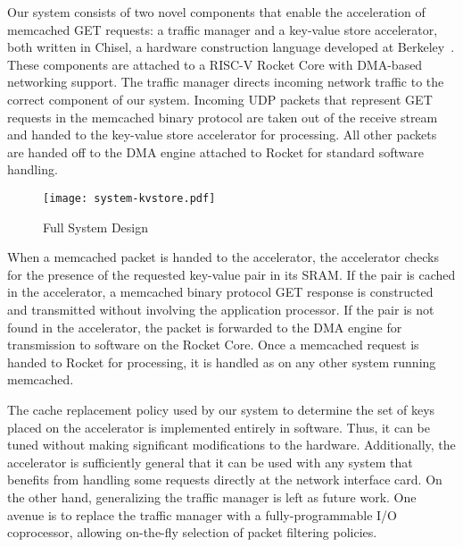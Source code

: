 Our system consists of two novel components that enable the acceleration of 
memcached GET requests: a traffic manager and a key-value store accelerator, 
both written in Chisel, a hardware construction language developed at Berkeley~\cite{chisel}.
These components are attached to a RISC-V Rocket Core with DMA-based networking 
support. The traffic manager directs incoming network traffic to the correct 
component of our system. Incoming UDP packets that represent GET requests in
the memcached binary protocol are taken out of the receive stream and handed to
the key-value store accelerator for processing. All other packets are handed
off to the DMA engine attached to Rocket for standard software handling.

\begin{figure}[t]
\begin{center}
\texttt{[image: system-kvstore.pdf]}
\caption{Full System Design}
\label{fig:full-sys}
\end{center}
\end{figure}

When a memcached packet is handed to the accelerator, the accelerator checks 
for the presence of the requested key-value pair in its SRAM. If the pair is
cached in the accelerator, a memcached binary protocol GET response is 
constructed and transmitted without involving the application processor. If the
pair is not found in the accelerator, the packet is forwarded to the DMA engine
for transmission to software on the Rocket Core. Once a memcached
request is handed to Rocket for processing, it is handled as on any other
system running memcached.

The cache replacement policy used by our system to determine the set of keys
placed on the accelerator is implemented entirely in software. Thus, it can be
tuned without making significant modifications to the hardware. Additionally,
the accelerator is sufficiently general that it can be used with any system that
benefits from handling some requests directly at the network interface card.
On the other hand, generalizing the traffic manager is left as future work. One
avenue is to replace the traffic manager with a fully-programmable I/O
coprocessor, allowing on-the-fly selection of packet filtering policies.
